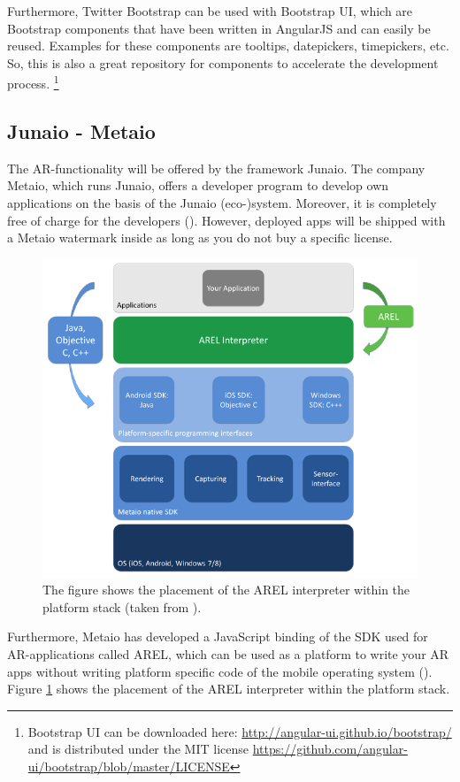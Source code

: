Furthermore, Twitter Bootstrap can be used with Bootstrap UI, which are Bootstrap components that have been written in AngularJS and can easily be reused. Examples for these components are tooltips, datepickers, timepickers, etc. So, this is also a great repository for components to accelerate the development process. \footnote{Bootstrap UI can be downloaded here: \url{http://angular-ui.github.io/bootstrap/} and is distributed under the MIT license \url{https://github.com/angular-ui/bootstrap/blob/master/LICENSE}}

\subsection{Junaio - Metaio}
\label{AREL}
The \ac{AR}-functionality will be offered by the framework Junaio. The company Metaio, which runs Junaio, offers a developer program to develop own applications on the basis of the Junaio (eco-)system. Moreover, it is completely free of charge for the developers (\cite{junaio1}). However, deployed apps will be shipped with a Metaio watermark inside as long as you do not buy a specific license. 

\begin{figure}[th]
\centerline{\includegraphics[width=.8\textwidth]{gfx/stackAREL}}
\caption{The figure shows the placement of the AREL interpreter within the platform stack (taken from \cite{MetaioDEV}).}
\label{stackArel}
\end{figure}

Furthermore, Metaio has developed a JavaScript binding of the SDK used for \ac{AR}-applications called \ac{AREL}, which can be used as a platform to write your \ac{AR} apps without writing platform specific code of the mobile operating system (\cite{MetaioDEV}). Figure \ref{stackArel} shows the placement of the \ac{AREL} interpreter within the platform stack. 

